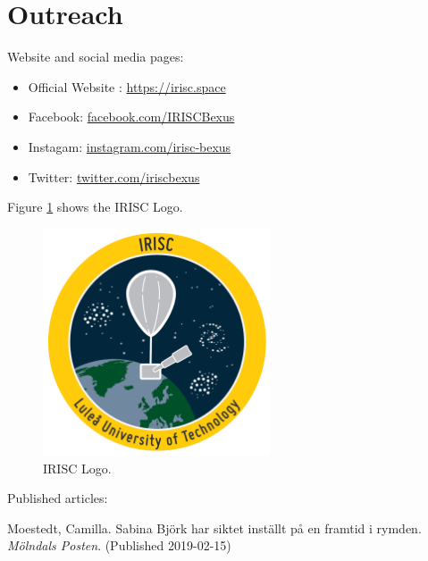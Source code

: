 \newpage
\section{Outreach} \label{sec:appB}

Website and social media pages: 

\begin{itemize}
	\item Official Website : \url{https://irisc.space}
	\item Facebook: \url{facebook.com/IRISCBexus}
	\item Instagam: \url{instagram.com/irisc-bexus}
	\item Twitter: \url{twitter.com/iriscbexus}
\end{itemize}

Figure \ref{fig:loggo} shows the IRISC Logo.

\begin{figure}[H]
	\centering
	\includegraphics[width=0.6\textwidth]{0-cover/img/logo-irisc.png}
	\caption{IRISC Logo.}
	\label{fig:loggo}
\end{figure}

Published articles: 

Moestedt, Camilla. Sabina Björk har siktet inställt på en framtid i rymden. \textit{Mölndals Posten}. (Published 2019-02-15)